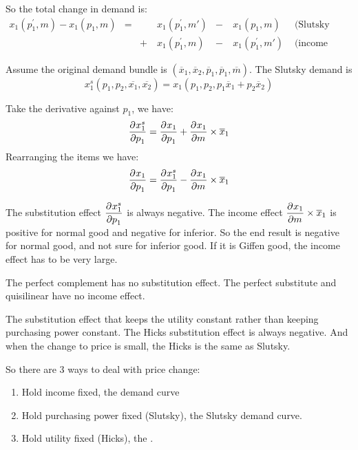 So the total change in demand is:
\begin{equation}
    \begin{aligned}
        x_1(p_1^{'},m) - x_1(p_1,m) &= & &x_1(p_1^{'}, m') &-&\ x_1(p_1,m) &\text{ (Slutsky effect)}\\
        &&+\ & x_1(p_1^{'},m) &-&\ x_1(p_1^{'}, m') &\text{ (income effect)}
    \end{aligned}
\end{equation}


Assume the original demand bundle is $(\overline{x}_1,\overline{x}_2,\overline{p}_1,\overline{p}_1,\overline{m})$. The Slutsky demand is
\begin{equation}
    x_1^s(p_1,p_2,\overline{x_1},\overline{x_2}) = x_1(p_1,p_2,p_1 \overline{x}_1 + p_2 \overline{x}_2)
\end{equation}

Take the derivative against $p_1$, we have:
\begin{equation}
    \dpd{x_1^s}{p_1} = \dpd{x_1}{p_1} + \dpd{x_1}{m} \times \overline{x}_1
\end{equation}
Rearranging the items we have:
\begin{equation}
    \dpd{x_1}{p_1} = \dpd{x_1^s}{p_1} - \dpd{x_1}{m} \times \overline{x}_1
\end{equation}



The substitution effect $\dpd{x_1^s}{p_1} $ is always negative. The income effect $\dpd{x_1}{m} \times \overline{x}_1$ is positive for normal good and negative for inferior. So the end result is negative for normal good, and not sure for inferior good. If it is Giffen good, the income effect has to be very large.

\begin{example}
    The perfect complement has no substitution effect. The perfect substitute and quisilinear have no income effect.
\end{example}


\begin{definition}
    The substitution effect that keeps the utility constant rather than keeping purchasing power constant. The Hicks substitution effect is always negative. And when the change to price is small, the Hicks is the same as Slutsky.
\end{definition}

So there are 3 ways to deal with price change:
\begin{enumerate}
    \item Hold income fixed, the demand curve
    \item Hold purchasing power fixed (Slutsky), the Slutsky demand curve.
    \item Hold utility fixed (Hicks), the .
\end{enumerate}


